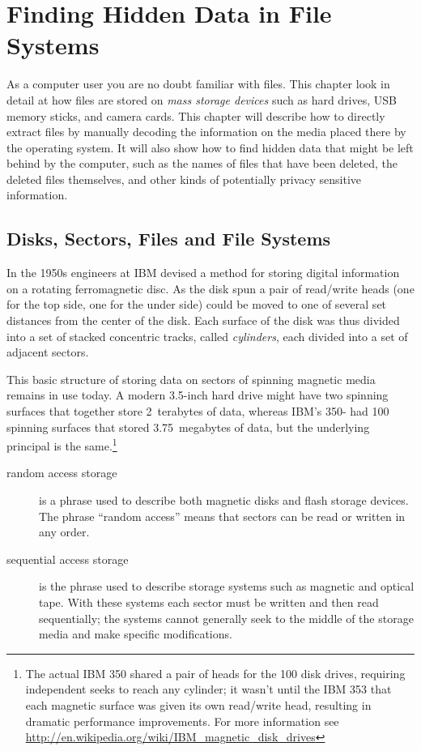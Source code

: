 

\chapter{Finding Hidden Data in File Systems}
As a computer user you are no doubt familiar with files. This
chapter look in detail at how files are stored on \emph{mass
  storage devices} such as hard drives, USB memory sticks, and camera
cards. This chapter will describe how to directly extract files by
manually decoding the information on the media placed there by the
operating system. It will also show how to find hidden data that might
be left behind by the computer, such as the names of files that have
been deleted, the deleted files themselves, and other kinds of
potentially privacy sensitive information. 

\section{Disks, Sectors, Files and File Systems}
In the 1950s engineers at IBM devised a method for storing digital
information on a rotating ferromagnetic disc. As the disk spun a pair
of read/write heads (one for the top side, one for the under side)
could be moved to one of several set distances from the center of the
disk. Each surface of the disk was thus divided into a set of stacked
concentric tracks, called \emph{cylinders}, each divided into a set of
adjacent sectors.




This basic structure of storing data on sectors of spinning magnetic
media remains in use today. A modern 3.5-inch hard drive might have two
spinning surfaces that together store 2~terabytes of data, whereas
IBM's 350- had 100 spinning surfaces that stored 3.75~megabytes of
data, but the underlying principal is the same.\footnote{The actual IBM 350
  shared a pair of heads for the 100 disk drives, requiring
  independent seeks to reach any cylinder; it wasn't until the IBM 353
  that each magnetic surface was given its own read/write head,
  resulting in dramatic performance improvements. For more information
  see \url{http://en.wikipedia.org/wiki/IBM_magnetic_disk_drives}}

\begin{description}
\item[random access storage] is a phrase used to describe both magnetic
  disks and flash storage devices. The phrase ``random access'' means
  that sectors can be read or written in any order. 
\item[sequential access storage] is the phrase used to describe
  storage systems such as magnetic and optical tape. With these
  systems each sector must be written and then read
sequentially; the systems cannot generally seek to the middle of the
storage media and make specific modifications.
\end{description}

